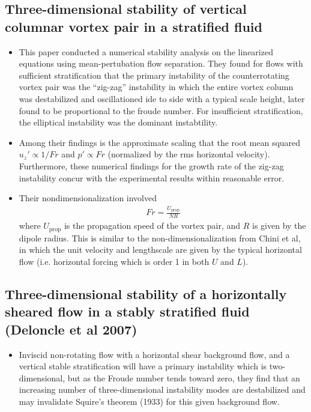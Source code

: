\documentclass{article}
\begin{document}
    \subsection{Three-dimensional stability of vertical columnar vortex pair in a
    stratified fluid}

    \begin{itemize}
        \item This paper conducted a numerical stability analysis on the linearized
        equations using mean-pertubation flow separation. They found for flows
        with sufficient stratification that the primary instability of the
        counterrotating vortex pair was the ``zig-zag'' instability in which the
        entire vortex column was destabilized and oscillationed ide to side with a
        typical scale height, later found to be proportional to the froude number.
        For insufficient stratification, the elliptical instability was the dominant
        instabtility. 
        \item Among their findings is the approximate scaling that the root mean
        squared $u_z' \propto
        1/Fr$ and $p' \propto Fr$ (normalized by the rms horizontal velocity).
        Furthermore, these numerical findings for the growth rate of the zig-zag
        instability concur with the experimental results
        within reasonable error. 
        \item Their nondimensionalization involved 
        \begin{gather*}
            Fr = \frac{U_{\text{prop}}}{NR}
        \end{gather*}
        where $U_{\text{prop}}$ is the propagation speed of the vortex pair, and $R$
        is given by the dipole radius. This is similar to the non-dimensionalization
        from Chini et al, in which the unit velocity and lengthscale are given by
        the typical horizontal flow (i.e. horizontal forcing which is order 1 in
        both $U$ and $L$). 
    \end{itemize}

    \subsection{Three-dimensional stability of a horizontally
sheared flow in a stably stratified fluid (Deloncle et al 2007)}
    \begin{itemize}
        \item Inviscid non-rotating flow with a horizontal shear background
        flow, and a vertical stable stratification will have a primary
        instability which is two-dimensional, but as the Froude number tends
        toward zero, they find that an increasing number of three-dimensional
        instability modes are destabilized and may invalidate Squire's theorem
        (1933) for this given background flow.
    \end{itemize}
\end{document}
